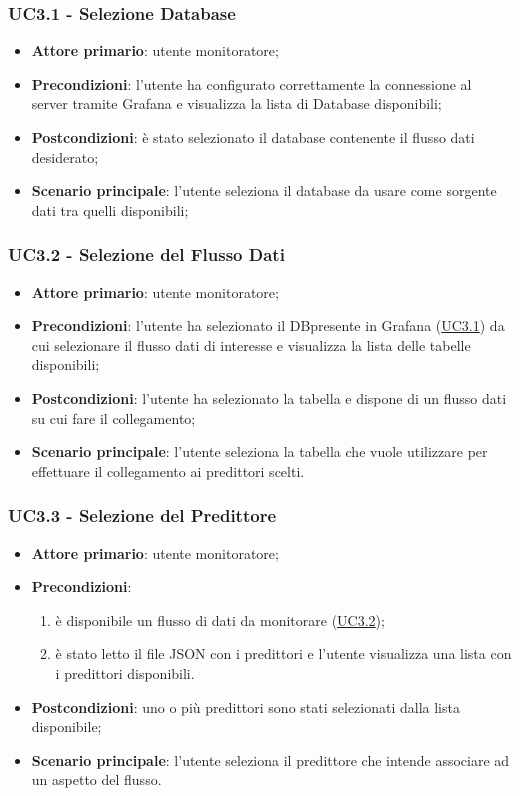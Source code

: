 		\label{par:UC3.1}
		\subsubsection{UC3.1 - Selezione Database}
		\begin{itemize}
			\item\textbf{Attore primario}: utente monitoratore;
			\item\textbf{Precondizioni}: l’utente ha configurato correttamente la connessione al server tramite Grafana e visualizza la lista di Database disponibili;
			\item\textbf{Postcondizioni}: è stato selezionato il database contenente il flusso dati desiderato;
			\item\textbf{Scenario principale}: l’utente seleziona il database da usare come sorgente dati tra quelli disponibili;
		\end{itemize}
		
		\label{par:UC3.2}
		\subsubsection{UC3.2 - Selezione del Flusso Dati}
		\begin{itemize}
			\item\textbf{Attore primario}: utente monitoratore;
			\item\textbf{Precondizioni}: l’utente ha selezionato il DB\glo presente in Grafana (\hyperref[par:UC3.1]{UC3.1}) da cui selezionare il flusso dati di interesse e visualizza la lista delle tabelle disponibili;
			\item\textbf{Postcondizioni}: l’utente ha selezionato la tabella e dispone di un flusso dati su cui fare il collegamento;
			\item\textbf{Scenario principale}: l’utente seleziona la tabella che vuole utilizzare per effettuare il collegamento ai predittori scelti.
		\end{itemize}
		
		\label{par:UC3.3}
		\subsubsection{UC3.3 - Selezione del Predittore}
		\begin{itemize}
			\item\textbf{Attore primario}: utente monitoratore;
			\item\textbf{Precondizioni}:
				\begin{enumerate}
					\item è disponibile un flusso di dati da monitorare (\hyperref[par:UC3.2]{UC3.2});
					\item è stato letto il file JSON con i predittori e l'utente visualizza una lista con i predittori disponibili.
				\end{enumerate}
			\item\textbf{Postcondizioni}: uno o più predittori sono stati selezionati dalla lista disponibile;
			\item\textbf{Scenario principale}: l’utente seleziona il predittore che intende associare ad un aspetto del flusso.
		\end{itemize}
	
